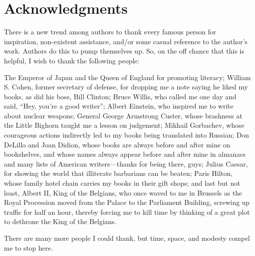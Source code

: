 

\chapter*{Acknowledgments} 

There is a new trend among authors to thank every famous person for inspiration, non-existent assistance, and/or some casual reference to the author’s work. Authors do this to pump themselves up. So, on the off chance that this is helpful, I wish to thank the following people: 

The Emperor of Japan and the Queen of England for promoting literacy; William S. Cohen, former secretary of defense, for dropping me a note saying he liked my books, as did his boss, Bill Clinton; Bruce Willis, who called me one day and said, “Hey, you’re a good writer”; Albert Einstein, who inspired me to write about nuclear weapons; General George Armstrong Custer, whose brashness at the Little Bighorn taught me a lesson on judgement; Mikhail Gorbachev, whose courageous actions indirectly led to my books being translated into Russian; Don DeLillo and Joan Didion, whose books are always before and after mine on bookshelves, and whose names always appear before and after mine in almanacs and many lists of American writers—thanks for being there, guys; Julius Caesar, for showing the world that illiterate barbarians can be beaten; Paris Hilton, whose family hotel chain carries my books in their gift shops; and last but not least, Albert II, King of the Belgians, who once waved to me in Brussels as the Royal Procession moved from the Palace to the Parliament Building, screwing up traffic for half an hour, thereby forcing me to kill time by thinking of a great plot to dethrone the King of the Belgians. 

There are many more people I could thank, but time, space, and modesty compel me to stop here.